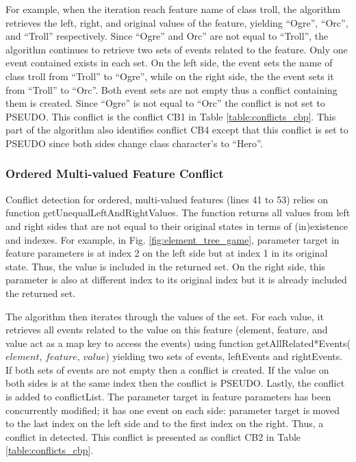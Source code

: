For example, when the iteration reach feature \textsf{name} of class \textsf{troll}, the algorithm retrieves the left, right, and original values of the feature, yielding ``Ogre'', ``Orc'', and ``Troll'' respectively. Since ``Ogre'' and Orc'' are not equal to ``Troll'', the algorithm continues to retrieve two sets of events related to the feature. Only one event contained exists in each set. On the left side, the event sets the name of class \textsf{troll} from ``Troll'' to ``Ogre'', while on the right side, the the event sets it from ``Troll'' to ``Orc''. Both event sets are not empty thus a conflict containing them is created. Since ``Ogre'' is not equal to ``Orc'' the conflict is not set to \textsf{PSEUDO}. This conflict is the conflict \textsf{CB1} in Table \ref{table:conflicts_cbp}. This part of the algorithm also identifies conflict \textsf{CB4} except that this conflict is set to \textsf{PSEUDO} since both sides change class \textsf{character}'s  to ``Hero''.   

\subsubsection{Ordered Multi-valued Feature Conflict} 
\label{sec:ordered_conflict}
Conflict detection for ordered, multi-valued features (lines 41 to 53) relies on function \textsf{getUnequalLeftAndRightValues}. The function returns all values from left and right sides that are not equal to their original states in terms of (in)existence and indexes. For example, in Fig. \ref{fig:element_tree_game}, parameter \textsf{target} in feature \textsf{parameters} is at index 2 on the left side but at index 1 in its original state. Thus, the value is included in the returned set. On the right side, this parameter is also at different index to its original index but it is already included the returned set. 

The algorithm then iterates through the values of the set. For each value, it retrieves all events related to the value on this feature (element, feature, and value act as a map key to access the events) using function \textsf{getAllRelated*Events($element$, $feature$, $value$)} yielding two sets of events, \textsf{leftEvents} and \textsf{rightEvents}. If both sets of events are not empty then a conflict is created. If the value on both sides is at the same index then the conflict is \textsf{PSEUDO}. Lastly, the conflict is added to \textsf{conflictList}. The parameter \textsf{target} in feature \textsf{parameters} has been concurrently modified; it has one event on each side: parameter \textsf{target} is moved to the last index on the left side and to the first index on the right. Thus, a conflict in detected. This conflict is presented as conflict \textsf{CB2} in Table \ref{table:conflicts_cbp}.


